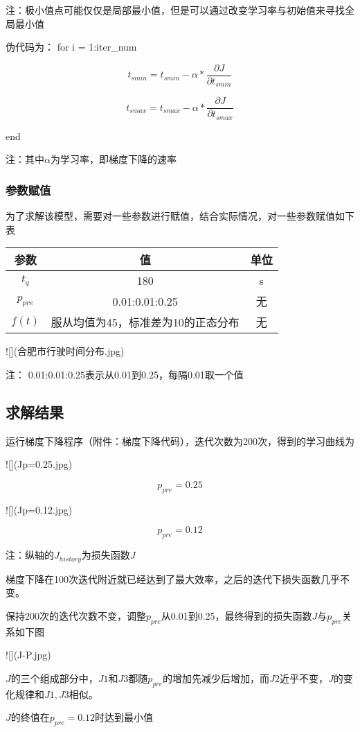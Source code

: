\documentclass[UTF8]{ctexart}
\begin{document}
	注：极小值点可能仅仅是局部最小值，但是可以通过改变学习率与初始值来寻找全局最小值
	
	伪代码为：
	for i = 1:iter_num
	
	$$ t_{smin} = t_{smin} - \alpha*\frac{\partial{J}}{\partial{t_{smin}}}$$
	
	$$ t_{smax} = t_{smax} - \alpha*\frac{\partial{J}}{\partial{t_{smax}}}$$
	
	end
	
	注：其中$\alpha$为学习率，即梯度下降的速率
	
	\subsubsection{参数赋值}
	为了求解该模型，需要对一些参数进行赋值，结合实际情况，对一些参数赋值如下表
	
	\begin{tabular}{ccc}
		\hline
		参数 & 值 & 单位\\
		\hline
		$t_q$ & 180 & s \\
		$p_{pre}$ & 0.01:0.01:0.25 & 无\\
		$f(t)$ & 服从均值为45，标准差为10的正态分布 & 无\\
		\hline
	\end{tabular}
	
	![](合肥市行驶时间分布.jpg)
	
	注： 0.01:0.01:0.25表示从0.01到0.25，每隔0.01取一个值
	
	\subsection{求解结果}
	运行梯度下降程序（附件：梯度下降代码），迭代次数为200次，得到的学习曲线为
	
	![](Jp=0.25.jpg)
	
	$$p_{pre}=0.25$$
	
	![](Jp=0.12.jpg)
	
	$$p_{pre}=0.12$$
	
	注：纵轴的$J_{history}$为损失函数$J$
	
	梯度下降在100次迭代附近就已经达到了最大效率，之后的迭代下损失函数几乎不变。
	
	保持200次的迭代次数不变，调整$p_{pre}$从0.01到0.25，最终得到的损失函数$J$与$p_{pre}$关系如下图
	
	![](J-P.jpg)
	
	$J$的三个组成部分中，$J1$和$J3$都随$p_{pre}$的增加先减少后增加，而$J2$近乎不变，$J$的变化规律和$J1,J3$相似。
	
	$J$的终值在$p_{pre}=0.12$时达到最小值
	
\end{document}
